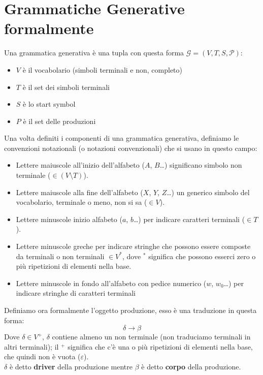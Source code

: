 \documentclass[class=book, crop=false, oneside, 12pt]{standalone}
\begin{document}
\section{Grammatiche Generative formalmente}
Una grammatica generativa è una tupla con questa forma \(\mathcal{G}=(V, T, S, \mathcal{P})\):
\begin{itemize}
    \item \(V\) è il vocabolario (simboli terminali e non, completo)
    \item \(T\) è il set dei simboli terminali
    \item \(S\) è lo start symbol
    \item \(P\) è il set delle produzioni
\end{itemize}
Una volta definiti i componenti di una grammatica generativa, definiamo le convenzioni notazionali (o notazioni convenzionali) che si usano in questo campo:
\begin{itemize}
    \item Lettere maiuscole all’inizio dell’alfabeto (\(A\), \(B\)…) significano simbolo non terminale (\(\in (V \setminus T)\)).
    \item Lettere maiuscole alla fine dell’alfabeto (\(X\), \(Y\), \(Z\)…) un generico simbolo del vocabolario, terminale o meno, non si sa (\(\in V\)).
    \item Lettere minuscole inizio alfabeto (\(a\), \(b\)…) per indicare caratteri terminali (\(\in T\)).
    \item Lettere minuscole greche per indicare stringhe che possono essere composte da terminali o non terminali \(\in V^*\), dove \(^*\) significa che possono esserci zero o più ripetizioni di elementi nella base.
    \item Lettere minuscole in fondo all’alfabeto con pedice numerico (\(w\), \(w_0\)…) per indicare stringhe di caratteri terminali
\end{itemize}
Definiamo ora formalmente l'oggetto produzione, esso è una traduzione in questa forma:
\begin{equation}
    \delta \to \beta
\end{equation}
Dove \(\delta \in V^+\), \(\delta\) contiene almeno un non terminale (non traduciamo terminali in altri terminali); il \(^+\) significa che c’è una o più ripetizioni di elementi nella base, che quindi non è vuota (\(\varepsilon\)).\\
\(\delta\) è detto \textbf{driver} della produzione mentre \(\beta\) è detto \textbf{corpo} della produzione.
\end{document}
